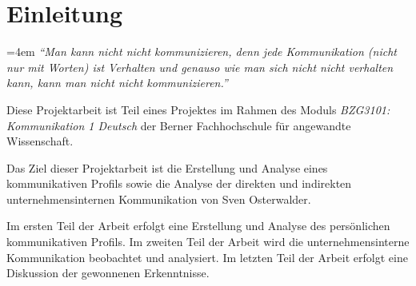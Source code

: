 \chapter{Einleitung}
\label{chap:intro}

\begingroup
    \leftskip=4em
    \rightskip\leftskip{}
    \textit{``Man kann nicht nicht kommunizieren, denn jede Kommunikation (nicht nur mit Worten) ist Verhalten und genauso wie man sich nicht nicht verhalten kann, kann man nicht nicht kommunizieren.''}~\cite{watzlawick2011menschliche}
    \par
\endgroup

Diese Projektarbeit ist Teil eines Projektes im Rahmen des Moduls \textit{BZG3101: Kommunikation 1 Deutsch} der Berner Fachhochschule für angewandte Wissenschaft.

Das Ziel dieser Projektarbeit ist die Erstellung und Analyse eines kommunikativen Profils sowie die Analyse der direkten und indirekten unternehmensinternen Kommunikation von Sven Osterwalder.

Im ersten Teil der Arbeit erfolgt eine Erstellung und Analyse des persönlichen kommunikativen Profils. Im zweiten Teil der Arbeit wird die unternehmensinterne Kommunikation beobachtet und analysiert. Im letzten Teil der Arbeit erfolgt eine Diskussion der gewonnenen Erkenntnisse.

%  
